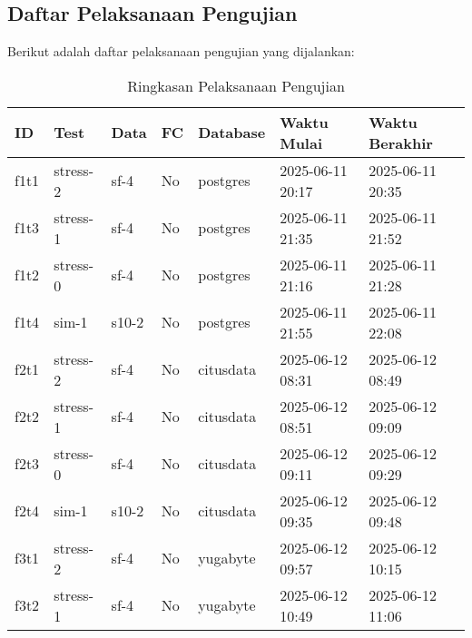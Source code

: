 \subsection{Daftar Pelaksanaan Pengujian}

Berikut adalah daftar pelaksanaan pengujian yang dijalankan:

\begin{table}[htbp]
    \centering
    \caption{Ringkasan Pelaksanaan Pengujian}
    \label{tab:execution-summary}
    \begin{tabular}{|l|l|l|l|l|l|l|}
        \hline
        \textbf{ID} & \textbf{Test} & \textbf{Data} & \textbf{FC} & \textbf{Database} & \textbf{Waktu Mulai} & \textbf{Waktu Berakhir} \\ \hline
        f1t1        & stress-2      & sf-4          & No          & postgres          & 2025-06-11 20:17     & 2025-06-11 20:35        \\ \hline
        f1t3        & stress-1      & sf-4          & No          & postgres          & 2025-06-11 21:35     & 2025-06-11 21:52        \\ \hline
        f1t2        & stress-0      & sf-4          & No          & postgres          & 2025-06-11 21:16     & 2025-06-11 21:28        \\ \hline
        f1t4        & sim-1         & s10-2         & No          & postgres          & 2025-06-11 21:55     & 2025-06-11 22:08        \\ \hline
        f2t1        & stress-2      & sf-4          & No          & citusdata         & 2025-06-12 08:31     & 2025-06-12 08:49        \\ \hline
        f2t2        & stress-1      & sf-4          & No          & citusdata         & 2025-06-12 08:51     & 2025-06-12 09:09        \\ \hline
        f2t3        & stress-0      & sf-4          & No          & citusdata         & 2025-06-12 09:11     & 2025-06-12 09:29        \\ \hline
        f2t4        & sim-1         & s10-2         & No          & citusdata         & 2025-06-12 09:35     & 2025-06-12 09:48        \\ \hline
        f3t1        & stress-2      & sf-4          & No          & yugabyte          & 2025-06-12 09:57     & 2025-06-12 10:15        \\ \hline
        f3t2        & stress-1      & sf-4          & No          & yugabyte          & 2025-06-12 10:49     & 2025-06-12 11:06        \\ \hline

\end{tabular}
\end{table}
